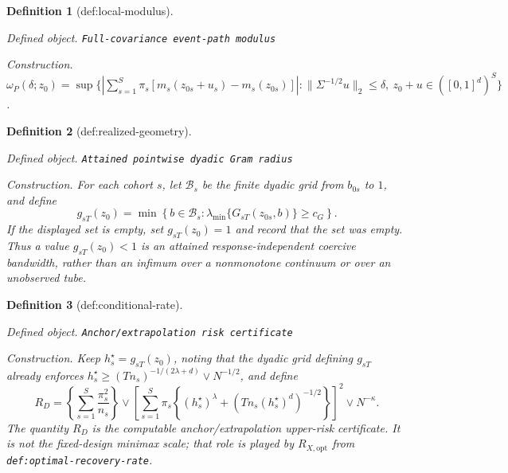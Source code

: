 \documentclass{article}
\newtheorem{definition}{Definition}
\begin{document}
\begin{definition}[def:local-modulus]\label{def:local-modulus}
\par\smallskip\noindent\emph{Defined object.} \texttt{Full-\allowbreak{}covariance event-\allowbreak{}path modulus}
\par\smallskip\noindent\emph{Construction.} \(\omega_P(\delta;z_0)=\sup\{|\sum_{s=1}^{S}\pi_s[m_s(z_{0s}+u_s)-m_s(z_{0s})]|:\|\Sigma^{-1/2}u\|_2\le\delta,\ z_0+u\in([0,1]^d)^S\}\).
\end{definition}

\begin{definition}[def:realized-geometry]\label{def:realized-geometry}
\par\smallskip\noindent\emph{Defined object.} \texttt{Attained pointwise dyadic Gram radius}
\par\smallskip\noindent\emph{Construction.} For each cohort \(s\), let \(\mathcal B_s\) be the finite dyadic grid from \(b_{0s}\) to \(1\), and define
\[
g_{sT}(z_0)=\min\left\{b\in\mathcal B_s:\lambda_{\min}\{G_{sT}(z_{0s},b)\}\ge c_G\right\}.
\]
If the displayed set is empty, set \(g_{sT}(z_0)=1\) and record that the set was empty. Thus a value \(g_{sT}(z_0)<1\) is an attained response-independent coercive bandwidth, rather than an infimum over a nonmonotone continuum or over an unobserved tube.
\end{definition}

\begin{definition}[def:conditional-rate]\label{def:conditional-rate}
\par\smallskip\noindent\emph{Defined object.} \texttt{Anchor/\allowbreak{}extrapolation risk certificate}
\par\smallskip\noindent\emph{Construction.} Keep \(h_s^\star=g_{sT}(z_0)\), noting that the dyadic grid defining
\(g_{sT}\) already enforces
\(h_s^\star\ge(Tn_s)^{-1/(2\lambda+d)}\vee N^{-1/2}\), and define
\[
 R_D=\left\{\sum_{s=1}^{S}\frac{\pi_s^2}{n_s}\right\}
 \vee
 \left[\sum_{s=1}^{S}\pi_s\left\{
 (h_s^\star)^\lambda+
 (Tn_s(h_s^\star)^d)^{-1/2}\right\}\right]^2
 \vee N^{-\kappa}.
\]
The quantity \(R_D\) is the computable anchor/extrapolation upper-risk
certificate.  It is not the fixed-design minimax scale; that role is played
by \(R_{X,\mathrm{opt}}\) from
\texttt{def:optimal-recovery-rate}.
\end{definition}
\end{document}
